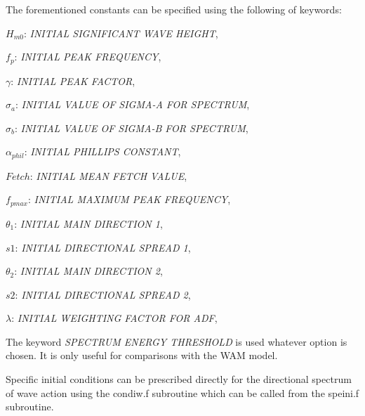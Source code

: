  The forementioned constants can be specified using the following of keywords:

 $H_{m0}$: \textit{INITIAL SIGNIFICANT WAVE HEIGHT},

 $f_p$:  \textit{INITIAL PEAK FREQUENCY},

 $\gamma$:  \textit{INITIAL PEAK FACTOR},

 $\sigma_a$:  \textit{INITIAL VALUE OF SIGMA-A FOR SPECTRUM},

 $\sigma_b$:  \textit{INITIAL VALUE OF SIGMA-B FOR SPECTRUM},

 $\alpha_{phil}$:  \textit{INITIAL PHILLIPS CONSTANT},

 $Fetch$:  \textit{INITIAL MEAN FETCH VALUE},

 $f_{pmax}$:  \textit{INITIAL MAXIMUM PEAK FREQUENCY},

 $\theta_1$:  \textit{INITIAL MAIN DIRECTION 1},

 $s1$:  \textit{INITIAL DIRECTIONAL SPREAD 1},

 $\theta_2$:  \textit{INITIAL MAIN DIRECTION 2},

 $s2$:  \textit{INITIAL DIRECTIONAL SPREAD 2},

 $\lambda$:  \textit{INITIAL WEIGHTING FACTOR FOR ADF},


 The keyword \textit{SPECTRUM ENERGY THRESHOLD} is used whatever option is chosen. It is only useful for comparisons with
 the WAM model.

 Specific initial conditions can be prescribed directly for the directional spectrum of wave action using the condiw.f
 subroutine which can be called from the speini.f subroutine.

